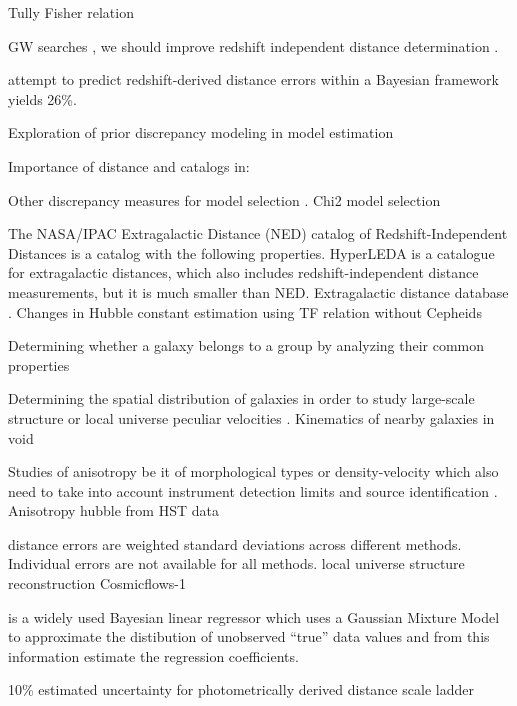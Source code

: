 \documentclass[a4paper,fleqn,usenatbib]{mnras}
\begin{document}
Tully Fisher relation \citet{precisetf}

GW searches \citet{gwgallist}, we should improve redshift independent distance determination .

\citet{6df} attempt to predict redshift-derived distance errors within a Bayesian framework yields 26\%.

Exploration of prior discrepancy modeling in model estimation \citet{priordisc}

Importance of distance and catalogs \citet{catetg,catspi} in:

Other discrepancy measures for model selection \citet{otherdisc}. Chi2 model selection \citet{chi2ms}

The NASA/IPAC Extragalactic Distance (NED) catalog of Redshift-Independent Distances \citet{ned07,ned} is  a catalog with the following properties. HyperLEDA \citet{hyperleda} is a catalogue for extragalactic distances, which also includes redshift-independent distance measurements, but it is much smaller than NED. Extragalactic distance database \citet{distdb}. Changes in Hubble constant estimation using TF relation without Cepheids \citet{noceph}

Determining whether a galaxy belongs to a group by analyzing their common properties \citet{gg3500} 

Determining the spatial distribution of galaxies in order to study large-scale structure \citet{gallargescale} or local universe peculiar velocities \citet{localunipv}. Kinematics of nearby galaxies in void \citet{void}

Studies of anisotropy be it of morphological types \citet{morphanis} or density-velocity \citet{nongauss} which also need to take into account instrument detection limits \citet{catmatch} and source identification \citet{baymatch}. Anisotropy hubble from HST data \citet{anishub}

\citet{cosmicflows} distance errors are weighted standard deviations across different methods. Individual errors are not available for all methods. \citet{locunivcf} local universe structure reconstruction Cosmicflows-1

\citet{gmastro} is a widely used Bayesian linear regressor which uses a Gaussian Mixture Model to approximate the distibution of unobserved ``true'' data values and from this information estimate the regression coefficients.

10\% estimated uncertainty for photometrically derived distance scale ladder \citet{hubunc}
\end{document}
